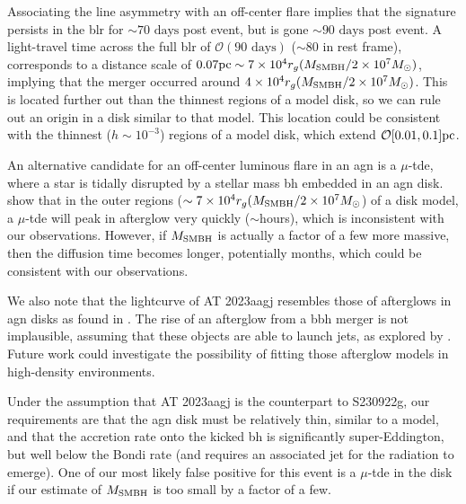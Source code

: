 \documentclass[twocolumn]{aastex631}
\begin{document}
Associating the line asymmetry with an off-center flare implies that the signature persists in the \gls{blr} for $\sim 70\text{ days}$ post event, but is gone $\sim 90\text{ days}$ post event.
A light-travel time across the full \gls{blr} of $\mathcal{O}(90\text{ days})$ ($\sim 80$ in rest frame), corresponds to a distance scale of $0.07{\rm pc} \sim 7 \times 10^{4}r_{g}(M_{\rm SMBH}/2 \times 10^{7}M_{\odot})$, implying that the merger occurred around $4 \times 10^{4}r_{g}(M_{\rm SMBH}/2 \times 10^{7}M_{\odot})$.
This is located further out than the thinnest regions of a \citet{SG03} model disk, so we can rule out an origin in a disk similar to that model. This location could be consistent with the thinnest ($h \sim 10^{-3}$) regions of a \citet{TQM05} model disk, which extend $\mathcal{O}[0.01,0.1]{\rm pc}$.

An alternative candidate for an off-center luminous flare in an \gls{agn} is a $\mu$-\gls{tde}, where a star is tidally disrupted by a stellar mass \gls{bh} embedded in an \gls{agn} disk.
\citet{Perna21} show that in the outer regions ($\sim 7 \times 10^{4}r_{g}(M_{\rm SMBH}/2 \times 10^{7}M_{\odot}$) of a \citet{TQM05} disk model, a $\mu$-\gls{tde} will peak in afterglow very quickly ($\sim$hours), which is inconsistent with our observations.
However, if $M_{\rm SMBH}$ is actually a factor of a few more massive, then the diffusion time becomes longer, potentially months, which could be consistent with our observations.

We also note that the lightcurve of AT 2023aagj resembles those of afterglows in \gls{agn} disks as found in \cite{Wang_2022}.
The rise of an afterglow from a \gls{bbh} merger is not implausible, assuming that these objects are able to launch jets, as explored by \citet{tagawaObservableSignatureMerging2023}.
Future work could investigate the possibility of fitting those afterglow models in high-density environments.

Under the assumption that AT 2023aagj is the counterpart to S230922g, our requirements are that the \gls{agn} disk must be relatively thin, similar to a \citet{TQM05} model, and that the accretion rate onto the kicked \gls{bh} is significantly super-Eddington, but well below the Bondi rate (and requires an associated jet for the radiation to emerge).
One of our most likely false positive for this event is a $\mu$-\gls{tde} in the disk if our estimate of $M_{\rm SMBH}$ is too small by a factor of a few.

\end{document}
